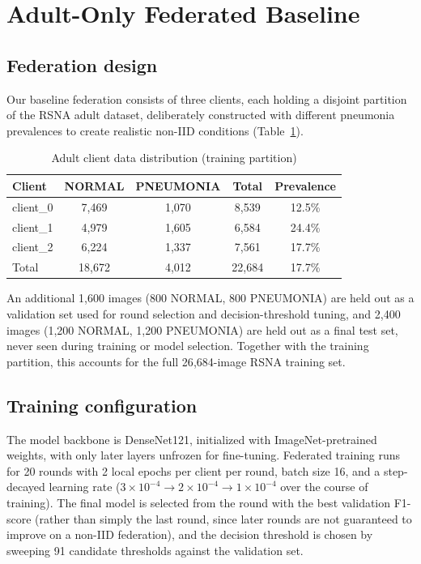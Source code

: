 \documentclass[conference]{IEEEtran}
\begin{document}
\section{Adult-Only Federated Baseline}
\label{sec:baseline}

\subsection{Federation design}

Our baseline federation consists of three clients, each holding a disjoint
partition of the RSNA adult dataset, deliberately constructed with different
pneumonia prevalences to create realistic non-IID conditions
(Table~\ref{tab:adult-clients}).

\begin{table}[htbp]
\caption{Adult client data distribution (training partition)}
\begin{center}
\begin{tabular}{lcccc}
\toprule
\textbf{Client} & \textbf{NORMAL} & \textbf{PNEUMONIA} & \textbf{Total} & \textbf{Prevalence} \\
\midrule
client\_0 & 7{,}469 & 1{,}070 & 8{,}539 & 12.5\% \\
client\_1 & 4{,}979 & 1{,}605 & 6{,}584 & 24.4\% \\
client\_2 & 6{,}224 & 1{,}337 & 7{,}561 & 17.7\% \\
\midrule
Total     & 18{,}672 & 4{,}012 & 22{,}684 & 17.7\% \\
\bottomrule
\end{tabular}
\label{tab:adult-clients}
\end{center}
\end{table}

An additional 1{,}600 images (800 NORMAL, 800 PNEUMONIA) are held out as a
validation set used for round selection and decision-threshold tuning, and
2{,}400 images (1{,}200 NORMAL, 1{,}200 PNEUMONIA) are held out as a final
test set, never seen during training or model selection. Together with the
training partition, this accounts for the full 26{,}684-image RSNA training
set.

\subsection{Training configuration}

The model backbone is DenseNet121, initialized with ImageNet-pretrained
weights, with only later layers unfrozen for fine-tuning. Federated training
runs for 20 rounds with 2 local epochs per client per round, batch size 16,
and a step-decayed learning rate ($3\times10^{-4} \rightarrow
2\times10^{-4} \rightarrow 1\times10^{-4}$ over the course of training). The
final model is selected from the round with the best validation F1-score
(rather than simply the last round, since later rounds are not guaranteed to
improve on a non-IID federation), and the decision threshold is chosen by
sweeping 91 candidate thresholds against the validation set.
\end{document}
